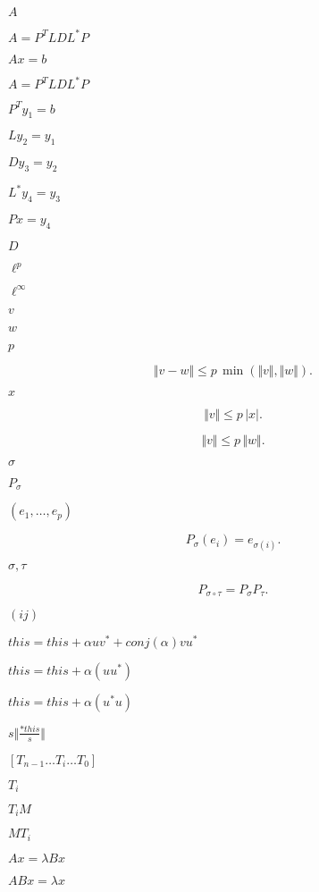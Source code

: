 \documentclass{article}
\begin{document}
$ A $
\pagebreak

$ A = P^TLDL^*P $
\pagebreak

$ A x = b $
\pagebreak

$ A = P^T L D L^* P $
\pagebreak

$ P^T y_1 = b $
\pagebreak

$ L y_2 = y_1 $
\pagebreak

$ D y_3 = y_2 $
\pagebreak

$ L^* y_4 = y_3 $
\pagebreak

$ P x = y_4 $
\pagebreak

$ D $
\pagebreak

$ \ell^p $
\pagebreak

$ \ell^\infty $
\pagebreak

$ v $
\pagebreak

$ w $
\pagebreak

$ p $
\pagebreak

\[ \Vert v - w \Vert \leqslant p\,\min(\Vert v\Vert, \Vert w\Vert). \]
\pagebreak

$ x $
\pagebreak

\[ \Vert v \Vert \leqslant p\,\vert x\vert. \]
\pagebreak

\[ \Vert v \Vert \leqslant p\,\Vert w\Vert. \]
\pagebreak

$ \sigma $
\pagebreak

$ P_\sigma $
\pagebreak

$ (e_1,\ldots,e_p) $
\pagebreak

\[ P_\sigma(e_i) = e_{\sigma(i)}. \]
\pagebreak

$ \sigma, \tau $
\pagebreak

\[ P_{\sigma\circ\tau} = P_\sigma P_\tau. \]
\pagebreak

$(ij)$
\pagebreak

$ this = this + \alpha u v^* + conj(\alpha) v u^* $
\pagebreak

$ this = this + \alpha ( u u^* ) $
\pagebreak

$ this = this + \alpha ( u^* u ) $
\pagebreak

$ s \Vert \frac{*this}{s} \Vert $
\pagebreak

$[T_{n-1} \ldots T_{i} \ldots T_{0}]$
\pagebreak

$ T_{i} $
\pagebreak

$ T_{i} M$
\pagebreak

$ M T_{i}$
\pagebreak

$ Ax = \lambda B x $
\pagebreak

$ ABx = \lambda x $
\pagebreak
\end{document}
